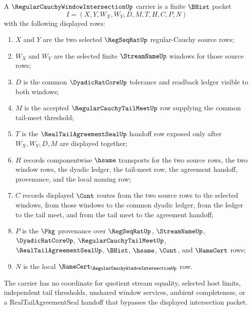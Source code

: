\begin{definition}
\label{def:regular-cauchy-window-intersection-carrier}
A $\RegularCauchyWindowIntersectionUp$ carrier is a finite $\BHist$ packet
$$
I=(X,Y,W_X,W_Y,D,M,T,H,C,P,N)
$$
with the following displayed rows:
\begin{enumerate}
\item $X$ and $Y$ are the two selected $\RegSeqRatUp$ regular-Cauchy source rows;
\item $W_X$ and $W_Y$ are the selected finite $\StreamNameUp$ windows for those source rows;
\item $D$ is the common $\DyadicRatCoreUp$ tolerance and readback ledger visible to both windows;
\item $M$ is the accepted $\RegularCauchyTailMeetUp$ row supplying the common tail-meet threshold;
\item $T$ is the $\RealTailAgreementSealUp$ handoff row exposed only after $W_X,W_Y,D,M$ are displayed together;
\item $H$ records componentwise $\hsame$ transports for the two source rows, the two window rows, the dyadic ledger, the tail-meet row, the agreement handoff, provenance, and the local naming row;
\item $C$ records displayed $\Cont$ routes from the two source rows to the selected windows, from those windows to the common dyadic ledger, from the ledger to the tail meet, and from the tail meet to the agreement handoff;
\item $P$ is the $\Pkg$ provenance over $\RegSeqRatUp$, $\StreamNameUp$, $\DyadicRatCoreUp$, $\RegularCauchyTailMeetUp$, $\RealTailAgreementSealUp$, $\BHist$, $\hsame$, $\Cont$, and $\NameCert$ rows;
\item $N$ is the local $\NameCert_{\RegularCauchyWindowIntersectionUp}$ row.
\end{enumerate}
The carrier has no coordinate for quotient stream equality, selected host limits, independent tail thresholds, unshared window services, ambient completeness, or a RealTailAgreementSeal handoff that bypasses the displayed intersection packet.
\end{definition}

